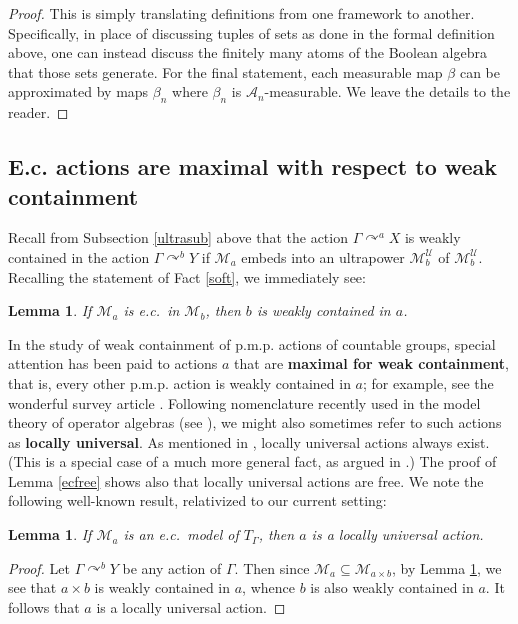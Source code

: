 \documentclass[12pt]{amsart}
\newtheorem{lem}[thm]{Lemma}
\theoremstyle{definition}
\def\cal{\mathcal}
\def\u{\mathsf 1}
\def \u{\mathcal U}
\newcommand{\pmp}{p{$.$}m{$.$}p{$.$}}
\newcommand{\acts}{\curvearrowright}
\begin{document}
\begin{proof}
This is simply translating definitions from one framework to another. Specifically, in place of discussing tuples of sets as done in the formal definition above, one can instead discuss the finitely many atoms of the Boolean algebra that those sets generate. For the final statement, each measurable map $\beta$ can be approximated by maps $\beta_n$ where $\beta_n$ is $\cal A_n$-measurable. We leave the details to the reader.
\end{proof}

\subsection{E.c. actions are maximal with respect to weak containment}

Recall from Subsection \ref{ultrasub} above that the action $\Gamma\acts^a X$ is weakly contained in the action $\Gamma\acts^b Y$ if $\cal M_a$ embeds into an ultrapower $\cal M_b^\u$ of $\cal M_b^\u$.  Recalling the statement of Fact \ref{soft}, we immediately see:

\begin{lem}\label{ecweak}
If $\cal M_a$ is e.c.\ in $\cal M_b$, then $b$ is weakly contained in $a$.
\end{lem}

In the study of weak containment of {\pmp} actions of countable groups, special attention has been paid to actions $a$ that are \textbf{maximal for weak containment}, that is, every other {\pmp} action is weakly contained in $a$; for example, see the wonderful survey article \cite[Section 5]{kechrisburton}.  Following nomenclature recently used in the model theory of operator algebras (see \cite{mtoa3}), we might also sometimes refer to such actions as \textbf{locally universal}.  As mentioned in \cite{kechrisburton}, locally universal actions always exist.  (This is a special case of a much more general fact, as argued in \cite{mtoa3}.)  The proof of Lemma \ref{ecfree} shows also that locally universal actions are free.  We note the following well-known result, relativized to our current setting:

\begin{lem} \label{lem:locuniv}
If $\cal M_a$ is an e.c.\ model of $T_\Gamma$, then $a$ is a locally universal action.
\end{lem}

\begin{proof}
Let $\Gamma\acts^b Y$ be any action of $\Gamma$.  Then since $\cal M_a\subseteq \cal M_{a\times b}$, by Lemma \ref{ecweak}, we see that $a\times b$ is weakly contained in $a$, whence $b$ is also weakly contained in $a$.  It follows that $a$ is a locally universal action.
\end{proof}
\end{document}
